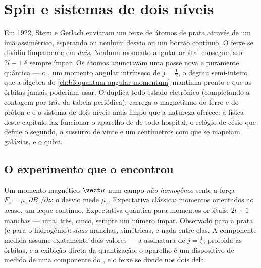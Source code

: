 \chapter{Spin e sistemas de dois níveis}\label{ch:b3:spin-two-level}

Em 1922, Stern e Gerlach enviaram um feixe de átomos de prata através
de um ímã assimétrico, esperando ou nenhum desvio ou um borrão
contínuo. O feixe se dividiu limpamente em \emph{dois}. Nenhum momento
angular orbital consegue isso: $2l + 1$ é sempre ímpar. Os átomos
anunciavam uma posse nova e puramente quântica --- o \emph{}, um
momento angular intrínseco de $j = \tfrac12$, o degrau semi-inteiro que
a álgebra do \cref{ch:b3:quantum-angular-momentum} mantinha pronto e
que as órbitas jamais poderiam usar. O  duplica todo estado
eletrônico (completando a contagem por trás da tabela periódica),
carrega o magnetismo do ferro e do próton e é o sistema de dois níveis
mais limpo que a natureza oferece: a física deste capítulo faz
funcionar o aparelho de  de todo hospital, o
relógio de césio que define o segundo, o sussurro de vinte e um
centímetros com que se mapeiam galáxias, e o qubit.

\section{O experimento que o encontrou}

\begin{example}\label{ex:b3:spin-two-level:stern-gerlach}
Um momento magnético $\vect\mu$ num campo \emph{não homogêneo} sente a
força $F_z = \mu_z\,\partial B_z/\partial z$: o desvio mede $\mu_z$.
Expectativa clássica: momentos orientados ao acaso, um leque contínuo.
Expectativa quântica para momentos orbitais: $2l + 1$ manchas --- uma,
três, cinco, sempre um número ímpar. Observado para a prata (e para o
hidrogênio): \emph{duas} manchas, simétricas, e nada entre elas. A
componente medida assume exatamente dois valores --- a assinatura de $j
= \tfrac12$, proibida às órbitas, e a exibição direta da quantização: o
aparelho é um dispositivo de medida de uma componente do , e o
feixe se divide nos dois  dela.
\end{example}

